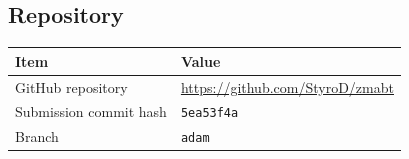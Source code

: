 \documentclass[12pt,a4paper]{article}
\begin{document}
\subsection{Repository}

\begin{tabular}{ll}
\toprule
\textbf{Item} & \textbf{Value} \\
\midrule
GitHub repository      & \url{https://github.com/StyroD/zmabt} \\
Submission commit hash & \texttt{5ea53f4a} \\
Branch                 & \texttt{adam} \\
\bottomrule
\end{tabular}
\end{document}
